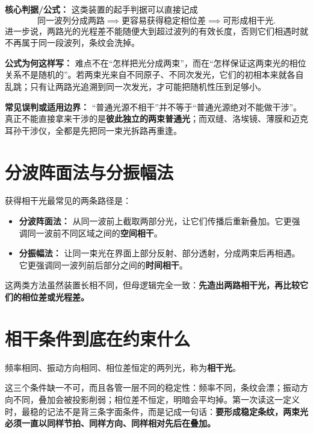 \documentclass[lang=cn,11pt]{elegantbook}
\begin{document}
\textbf{核心判据/公式：} 这类装置的起手判据可以直接记成
\[
\text{同一波列分成两路} \implies \text{更容易获得稳定相位差} \implies \text{可形成相干光}.
\]
进一步说，两路光的光程差不能随便大到超过波列的有效长度，否则它们相遇时就不再属于同一段波列，条纹会洗掉。

\textbf{公式为何这样写：} 难点不在“怎样把光分成两束”，而在“怎样保证这两束光的相位关系不是随机的”。若两束光来自不同原子、不同次发光，它们的初相本来就各自乱跳；只有让两路光追溯到同一次发光，才可能把随机性压到足够小。

\textbf{常见误判或适用边界：} “普通光源不相干”并不等于“普通光源绝对不能做干涉”。真正不能直接拿来干涉的是\textbf{彼此独立的两束普通光}；而双缝、洛埃镜、薄膜和迈克耳孙干涉仪，全都是先把同一束光拆路再重逢。

\section{分波阵面法与分振幅法}

获得相干光最常见的两条路径是：
\begin{itemize}
  \item \textbf{分波阵面法：} 从同一波前上截取两部分光，让它们传播后重新叠加。它更强调同一波前不同区域之间的\textbf{空间相干}。
  \item \textbf{分振幅法：} 让同一束光在界面上部分反射、部分透射，分成两束后再相遇。它更强调同一波列前后部分之间的\textbf{时间相干}。
\end{itemize}

\begin{note}
这两类方法虽然装置长相不同，但母逻辑完全一致：\textbf{先造出两路相干光，再比较它们的相位差或光程差。}
\end{note}

\section{相干条件到底在约束什么}

\begin{definition}[相干光]\label{def:coherent-light}
频率相同、振动方向相同、相位差恒定的两列光，称为\textbf{相干光}。
\end{definition}

\begin{note}
这三个条件缺一不可，而且各管一层不同的稳定性：频率不同，条纹会漂；振动方向不同，叠加会被投影削弱；相位差不恒定，明暗会平均掉。第一次读这一定义时，最稳的记法不是背三条字面条件，而是记成一句话：\textbf{要形成稳定条纹，两束光必须一直以同样节拍、同样方向、同样相对先后在叠加。}
\end{note}
\end{document}
